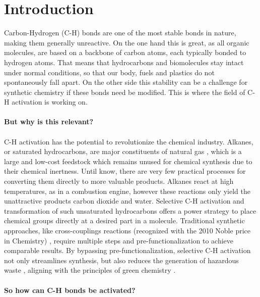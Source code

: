 \chapter{Introduction}
\label{sec:Introduction}
Carbon-Hydrogen (C-H) bonds are one of the most stable bonds in nature, making them generally unreactive. On the one hand this is great, as all organic molecules, are based on a backbone of carbon atoms, each typically bonded to hydrogen atoms. That means that hydrocarbons and biomolecules stay intact under normal conditions, so that our body, fuels and plastics do not spontaneously fall apart. On the other side this stability can be a challenge for synthetic chemistry if these bonds need be modified. This is where the field of C-H activation is working on. \\\\ 
\textbf{But why is this relevant?} \\ \\
C-H activation has the potential to revolutionize the chemical industry. Alkanes, or saturated hydrocarbons, are major constituents of natural gas \cite{labinger2002understanding}, which is a large and low-cost feedstock which remains unused for chemical synthesis \cite{bergman2007c} due to their chemical inertness. Until know, there are very few practical processes for converting them directly to more valuable products. Alkanes react at high temperatures, as in a combustion engine, however these reactions only yield the unattractive products carbon dioxide and water. Selective C-H activation and transformation of such unsaturated hydrocarbons offers a power strategy to place chemical groups directly at a desired part in a molecule. Traditional synthetic approaches, like cross-couplings reactions (recognized with the 2010 Noble price in Chemistry) \cite{Nobleprice2010, suzuki2011noble, negishi2011nobleprice}, require multiple steps and pre-functionalization to achieve comparable results. By bypassing pre-functionalization, selective C-H activation not only streamlines synthesis, but also reduces the generation of hazardous waste \cite{rogge2021c, goldberg2017large}, aligning with the principles of green chemistry \cite{dalton2021c}. \\ \\
\textbf{So how can C-H bonds be activated?} \\ \\
